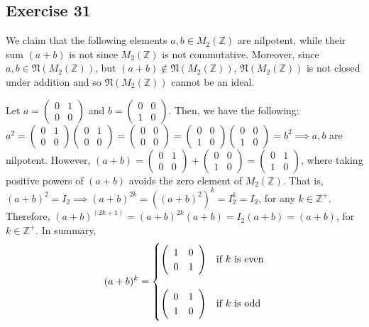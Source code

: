 \subsection*{Exercise 31}
We claim that the following elements $a,b \in M_2(\mathbb{Z})$ are nilpotent, while their sum $(a + b)$ is not since $M_2(\mathbb{Z})$ is not commutative. Moreover, since $a,b \in \mathfrak{N}(M_2(\mathbb{Z}))$, but $(a+b) \not\in \mathfrak{N}(M_2(\mathbb{Z}))$, $\mathfrak{N}(M_2(\mathbb{Z}))$ is not closed under addition and so $\mathfrak{N}(M_2(\mathbb{Z}))$ cannot be an ideal.

Let $a = \left( \begin{array}{cc}
    0 & 1 \\
    0 & 0
\end{array} \right) $ and $b = \left( \begin{array}{cc}
    0 & 0 \\
    1 & 0
\end{array} \right) $. Then, we have the following:
\newline
$a^2 = \left( \begin{array}{cc}
    0 & 1 \\
    0 & 0
\end{array} \right)\left( \begin{array}{cc}
    0 & 1 \\
    0 & 0
\end{array} \right) = \left( \begin{array}{cc}
    0 & 0 \\
    0 & 0
\end{array} \right) = \left( \begin{array}{cc}
    0 & 0 \\
    1 & 0
\end{array} \right)\left( \begin{array}{cc}
    0 & 0 \\
    1 & 0
\end{array} \right) = b^2 \implies a,b$ are nilpotent.
\newline
However, $(a+b) = \left( \begin{array}{cc}
    0 & 1 \\
    0 & 0
\end{array} \right) + \left( \begin{array}{cc}
    0 & 0 \\
    1 & 0
\end{array} \right) = \left( \begin{array}{cc}
    0 & 1 \\
    1 & 0
\end{array} \right)$, where taking positive powers of $(a+b)$ avoids the zero element of $M_2(\mathbb{Z})$. That is, $(a + b)^2 = I_2 \implies (a + b)^{2k} = ((a+b)^2)^k = I_2^k = I_2$, for any $k \in \mathbb{Z}^+$. Therefore, $(a + b)^{(2k+1)} = (a+b)^{2k}(a+b) = I_2(a+b) = (a+b)$, for $k \in \mathbb{Z}^+$. In summary,
\[
(a+b)^k = 
\begin{cases}
\left( \begin{array}{cc}
    1 & 0 \\
    0 & 1
\end{array} \right) & \textnormal{if } k \textnormal{ is even} \\
\\
\left( \begin{array}{cc}
    0 & 1 \\
    1 & 0
\end{array} \right) & \textnormal{if } k \textnormal{ is odd} 
\end{cases}
\]